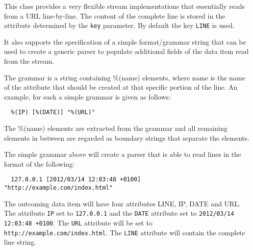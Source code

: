 
This class provides a very flexible stream implementations that
essentially reads from a URL line-by-line. The content of the complete
line is stored in the attribute determined by the \texttt{key}
parameter. By default the key \texttt{LINE} is used.

It also supports the specification of a simple format/grammar string
that can be used to create a generic parser to populate additional
fields of the data item read from the stream.

The grammar is a string containing {\ttfamily \%(name)} elements,
where {\ttfamily name} is the name of the attribute that should be
created at that specific portion of the line. An example, for such
a simple grammar is given as follows:
\begin{verbatim}
  %(IP) [%(DATE)] "%(URL)"
\end{verbatim}
The {\ttfamily \%(name)} elements are extracted from the grammar and
all remaining elements in between are regarded as boundary strings that
separate the elements.

The simple grammar above will create a parser that is able to read
lines in the format of the following:
\begin{verbatim}
  127.0.0.1 [2012/03/14 12:03:48 +0100] "http://example.com/index.html"
\end{verbatim}


The outcoming data item will have four attributes {\ttfamily LINE},
{\ttfamily IP}, {\ttfamily DATE} and {\ttfamily URL}. The attribute
\texttt{IP} set to \texttt{127.0.0.1} and the \texttt{DATE} attribute
set to \texttt{2012/03/14 12:03:48 +0100}. The \texttt{URL} attribute
will be set to \texttt{http://example.com/index.html}. The
\texttt{LINE} attribute will contain the complete line string.

